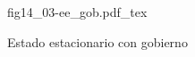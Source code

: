 \begin{figure}[h]
\centering
\def\svgwidth{0.5\textwidth}
{fig14_03-ee_gob.pdf_tex}
\caption{Estado estacionario con gobierno}
\label{fig14_03-ee_gob}
\end{figure}